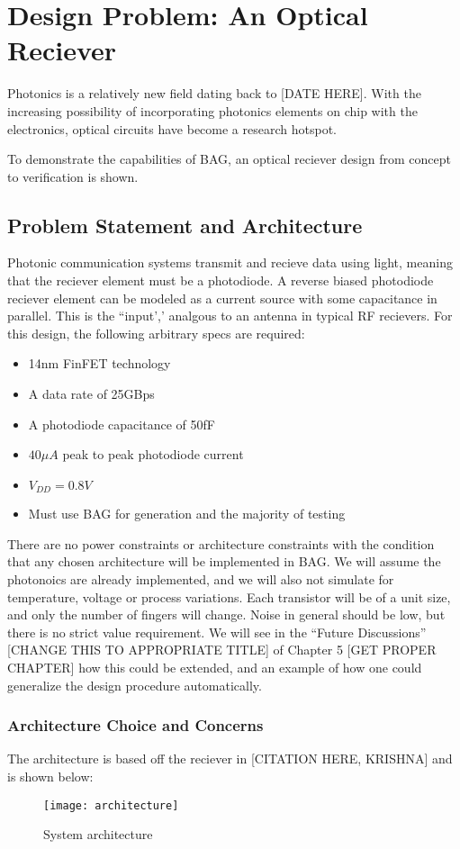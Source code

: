 \chapter{Design Problem: An Optical Reciever}

Photonics is a relatively new field dating back to [DATE HERE]. With the increasing possibility of incorporating photonics elements on chip with the electronics, optical circuits have become a research hotspot. 

To demonstrate the capabilities of BAG, an optical reciever design from concept to verification is shown.

\section{Problem Statement and Architecture}
Photonic communication systems transmit and recieve data using light, meaning that the reciever element must be a photodiode. A reverse biased photodiode reciever element can be modeled as a current source with some capacitance in parallel. This is the ``input',' analgous to an antenna in typical RF recievers. For this design, the following arbitrary specs are required:
\begin{itemize}
\item 14nm FinFET technology
\item A data rate of 25GBps
\item A photodiode capacitance of 50fF
\item $40\mu A$ peak to peak photodiode current
\item $V_{DD}=0.8V$
\item Must use BAG for generation and the majority of testing
\end{itemize}

There are no power constraints or architecture constraints with the condition that any chosen architecture will be implemented in BAG. We will assume the photonoics are already implemented, and we will also not simulate for temperature, voltage or process variations. Each transistor will be of a unit size, and only the number of fingers will change. Noise in general should be low, but there is no strict value requirement. We will see in the ``Future Discussions'' [CHANGE THIS TO APPROPRIATE TITLE] of Chapter 5 [GET PROPER CHAPTER] how this could be extended, and an example of how one could generalize the design procedure automatically.

\subsection{Architecture Choice and Concerns}
The architecture is based off the reciever in [CITATION HERE, KRISHNA] and is shown below:
\begin{figure}[h]
\centering
\texttt{[image: architecture]}
\caption{System architecture}
\label{fig:System Architecture}
\end{figure}

